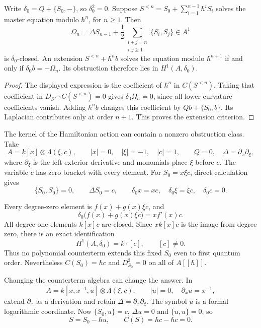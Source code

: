 \begin{proposition}\label{cbc:anomaly:BV-obstruction}
Write $\delta_0=Q+\{S_0,-\}$, so $\delta_0^2=0$.
Suppose $S^{<n}=S_0+\sum_{i=1}^{n-1}\hbar^iS_i$ solves the master equation modulo $\hbar^n$, for $n\geq1$.
Then
\[
 \Omega_n=\Delta S_{n-1}
   +\frac12\sum_{\substack{i+j=n\\i,j\geq1}}\{S_i,S_j\}
 \in A^1
\]
is $\delta_0$-closed.
An extension $S^{<n}+\hbar^nb$ solves the equation modulo $\hbar^{n+1}$ if and only if $\delta_0b=-\Omega_n$.
Its obstruction therefore lies in $H^1(A,\delta_0)$.
\end{proposition}
\begin{proof}
The displayed expression is the coefficient of $\hbar^n$ in $C(S^{<n})$.
Taking that coefficient in $D_{S^{<n}}C(S^{<n})=0$ gives $\delta_0\Omega_n=0$, since all lower curvature coefficients vanish.
Adding $\hbar^nb$ changes this coefficient by $Qb+\{S_0,b\}$.
Its Laplacian contributes only at order $n+1$.
This proves the extension criterion.
\end{proof}

The kernel of the Hamiltonian action can contain a nonzero obstruction class.
Take
\[
 A=k[x]\otimes\Lambda(\xi,c),\qquad
 |x|=0,\quad |\xi|=-1,\quad |c|=1,
 \qquad Q=0,\quad \Delta=\partial_x\partial_\xi,
\]
where $\partial_\xi$ is the left exterior derivative and monomials place $\xi$ before $c$.
The variable $c$ has zero bracket with every element.
For $S_0=x\xi c$, direct calculation gives
\[
 \{S_0,S_0\}=0,\qquad \Delta S_0=c,
 \qquad \delta_0x=xc,\quad \delta_0\xi=\xi c,\quad \delta_0c=0.
\]

Every degree-zero element is $f(x)+g(x)\xi c$, and
\[
 \delta_0\bigl(f(x)+g(x)\xi c\bigr)=xf'(x)c.
\]
All degree-one elements $k[x]c$ are closed.
Since $xk[x]c$ is the image from degree zero, there is an exact identification
\begin{equation}\label{eq:cbc:anomaly:central-class}
 H^1(A,\delta_0)=k\cdot[c],\qquad [c]\ne0.
\end{equation}
Thus no polynomial counterterm extends this fixed $S_0$ even to first quantum order.
Nevertheless $C(S_0)=\hbar c$ and $D_{S_0}^2=0$ on all of $A[[\hbar]]$.

Changing the counterterm algebra can change the answer.
In
\[
 \widetilde A=k[x,x^{-1},u]\otimes\Lambda(\xi,c),
 \qquad |u|=0,\quad \partial_xu=x^{-1},
\]
extend $\partial_x$ as a derivation and retain $\Delta=\partial_x\partial_\xi$.
The symbol $u$ is a formal logarithmic coordinate.
Now $\{S_0,u\}=c$, $\Delta u=0$ and $\{u,u\}=0$, so
\[
 S=S_0-\hbar u,\qquad C(S)=\hbar c-\hbar c=0.
\]

